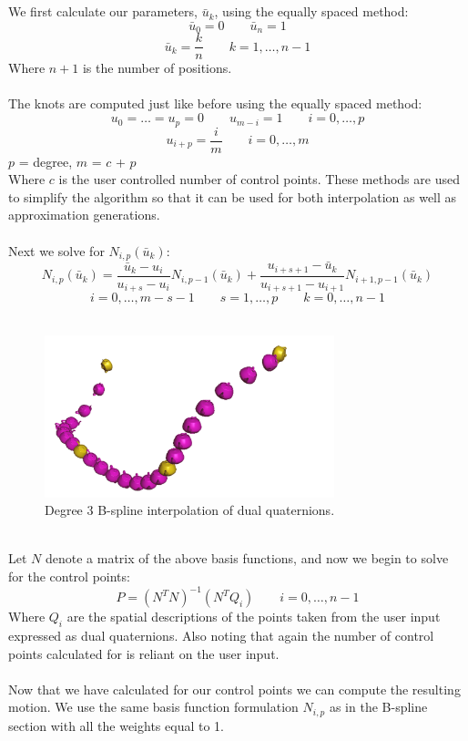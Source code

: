 \documentclass[11pt]{article}
\begin{document}
\\
\\
We first calculate our parameters, $\bar{u}_k$, using the equally spaced method:
$$ \bar{u}_0 = 0 \qquad \bar{u}_n = 1 $$
$$ \bar{u}_k = \frac{k}{n} \qquad k = 1,\ldots,n-1$$
Where $n+1$ is the number of positions.
\\
\\
The knots are computed just like before using the equally spaced method:
$$ u_0 = \ldots = u_p = 0 \qquad u_{m-i} = 1 \qquad i = 0,\ldots , p$$
$$ u_{i+p} = \frac{i}{m} \qquad i = 0,\ldots, m$$
$p$ = degree, $m$ = $c$ + $p$
\\
Where $c$ is the user controlled number of control points. These methods are used to simplify the algorithm so that it can be used for both interpolation as well as approximation generations.
\\
\\
Next we solve for $N_{i,p}(\bar{u}_k)$:
$$ N_{i,p}(\bar{u}_k) = \frac{\bar{u}_k-u_i}{u_{i+s}-u_i} N_{i,p-1}(\bar{u}_k)+ \frac{u_{i+s+1}-\bar{u}_k}{u_{i+s+1}-u_{i+1}} N_{i+1,p-1}(\bar{u}_k) $$
$$ i = 0,\ldots, m-s-1 \qquad s = 1,\ldots, p \qquad k = 0,\ldots, n-1 $$
\\
\begin{figure}[h]
  \centering
  \includegraphics[width=0.75\textwidth]{DQ_B-spline.png}
  \caption{Degree 3 B-spline interpolation of dual quaternions.}
  \label{Figure: 2}
\end{figure}
\\
Let $N$ denote a matrix of the above basis functions, and now we begin to solve for the control points:
$$ P = (N^T N)^{-1}( N^TQ_i) \qquad i = 0,\ldots, n-1$$
Where $Q_i$ are the spatial descriptions of the points taken from the user input expressed as dual quaternions. Also noting that again the number of control points calculated for is reliant on the user input.
\\
\\
Now that we have calculated for our control points we can compute the resulting motion. We use the same basis function formulation $N_{i,p}$ as in the B-spline section with all the weights equal to 1.
\end{document}
